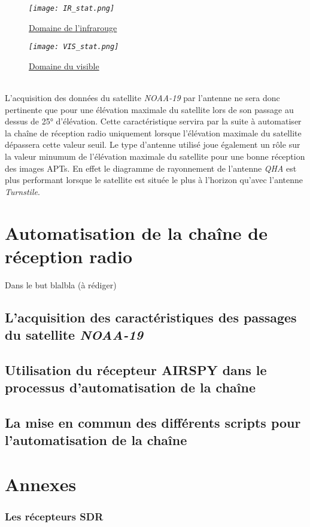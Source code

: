 \documentclass[12pt,fleqn]{book} %
\begin{document}
\begin{figure}[H]
	\centering
	\itshape
	\texttt{[image: IR\_stat.png]}
	\caption{\label{IR_stat} \underline{Domaine de l'infrarouge}}
\end{figure}
\begin{figure}[H]
	\centering
	\itshape
	\texttt{[image: VIS\_stat.png]}
	\caption{\label{VIS_stat} \underline{Domaine du visible}}
\end{figure}
~\\L'acquisition des données du satellite \emph{NOAA-19} par l'antenne ne sera donc pertinente que pour une élévation maximale du satellite lors de son passage au dessus de 25° d'élévation. Cette caractéristique servira par la suite à automatiser la chaîne de réception radio uniquement lorsque l'élévation maximale du satellite dépassera cette valeur seuil.
Le type d'antenne utilisé joue également un rôle sur la valeur minumum de l'élévation maximale du satellite pour une bonne réception des images APTs. En effet le diagramme de rayonnement de l'antenne \emph{QHA} est plus performant lorsque le satellite est située le plus à l'horizon qu'avec l'antenne \emph{Turnstile}.

\part{Automatisation de la chaîne de réception radio}
Dans le but blalbla (à rédiger)
\setcounter{chapter}{0}
\chapter{L'acquisition des caractéristiques des passages du satellite \emph{NOAA-19}}
\chapter{Utilisation du récepteur AIRSPY dans le processus d'automatisation de la chaîne}
\chapter{La mise en commun des différents scripts pour l'automatisation de la chaîne}




\setcounter{part}{-5}
\part{Annexes}
\section{Les récepteurs SDR}
\end{document}
